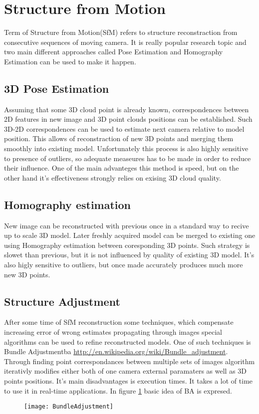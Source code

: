 \section{Structure from Motion}
Term of Structure from Motion(SfM) refers to structure reconstraction from consecutive sequences of moving camera. It is really popular research topic and two main different approaches called Pose Estimation and Homography Estimation can be used to make it happen.
\subsection{3D Pose Estimation}
Assuming that some 3D cloud point is already known, correspondences between 2D features in new image and 3D point clouds positions can be established. Such 3D-2D correspondences can be used to estimate next camera relative to model position. This allows of reconstraction of new 3D points and merging them smoothly into existing model. Unfortunately this process is also highly sensitive to presence of outliers, so adequate measeures has to be made in order to reduce their influence. One of the main advanteges this method is speed, but on the other hand it's effectiveness strongly relies on exising 3D cloud quality. 
\subsection{Homography estimation}
New image can be reconstructed with previous once in a standard way to recive up to scale 3D model. Later freshly acquired model can be merged to existing one using Homography estimation between coresponding 3D points. Such strategy is slowet than previous, but it is not influenced by quality of existing 3D model. It's also higly sensitive to outliers, but once made accurately produces much more new 3D points.
\subsection{Structure Adjustment}
After some time of SfM reconstruction some techniques, which compensate increasing error of wrong estimates propagating through images special algorithms can be used to refine reconstructed models. One of such techniques is Bundle Adjustment\gls{ba} \url{http://en.wikipedia.org/wiki/Bundle_adjustment}. Through finding point correspondances between multiple sets of images algorithm iterativly modifies either both of one camera external paramaters as well as 3D points positions. It's main disadvantages is execution times. It takes a lot of time to use it in real-time applications. In figure \ref{fig:BundleAdjustment} basic idea of BA is expresed.
\begin{figure}[p]
    \centering
    \texttt{[image: BundleAdjustment]}
    \caption{}
    \label{fig:BundleAdjustment}
\end{figure}
